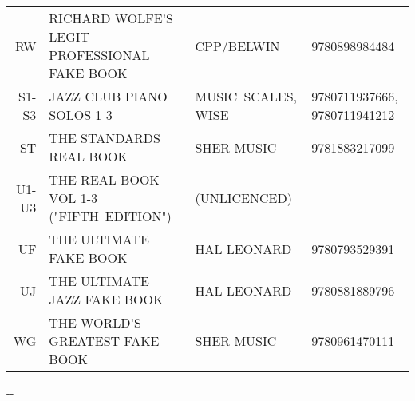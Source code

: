 \documentclass[8pt]{scrartcl}
\begin{document}
\begin{center}
\begin{tabular}{rp{}p{}p{}}
    RW    & RICHARD WOLFE'S LEGIT PROFESSIONAL FAKE BOOK    & CPP/BELWIN         & 9780898984484 \\
    S1-S3 & JAZZ CLUB PIANO SOLOS 1-3                       & MUSIC~SCALES, WISE & 9780711937666, 9780711941212 \\
    ST    & THE STANDARDS REAL BOOK                         & SHER MUSIC         & 9781883217099 \\
    U1-U3 & THE REAL BOOK VOL 1-3 ("FIFTH~EDITION")         & (UNLICENCED)       & \\
    UF    & THE ULTIMATE FAKE BOOK                          & HAL LEONARD        & 9780793529391 \\
    UJ    & THE ULTIMATE JAZZ FAKE BOOK                     & HAL LEONARD        & 9780881889796 \\
    WG    & THE WORLD'S GREATEST FAKE BOOK                  & SHER MUSIC         & 9780961470111 \\


  \end{tabular}
\end{center}

\begin{multicols}{3}
  \raggedright
  
\end{multicols}

\begin{center}
  \the\year-\the\month-\the\day
\end{center}
\end{document}
